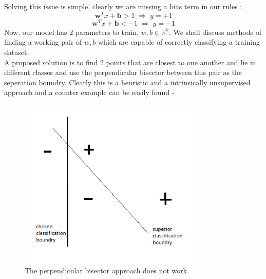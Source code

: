 \documentclass[12pt]{article}
\begin{document}
Solving this issue is simple, clearly we are missing a bias term in our rules :
$$\mathbf{w}^Tx + \mathbf{b} > 1 \; \Rightarrow \; y=+1$$
$$\mathbf{w}^Tx + \mathbf{b} < -1 \; \Rightarrow \; y=-1$$
Now, our model has 2 parameters to train, $w,b \in \mathbb{R}^k$. We shall discuss methods of finding a working pair of $w,b$ which are capable of correctly classifying a training dataset.\\[2mm]
A proposed solution is to find 2 points that are closest to one another and lie in different classes and use the perpendicular bisector between this pair as the seperation boundry. Clearly this is a heuristic and a intrinsically unsupervised approach and a counter example can be easily found -
\begin{figure}[H]
    \centering
    \includegraphics[width=9cm]{counter-perp-bisector.png}%
    \caption{The perpendicular bisector approach does not work.}
\end{figure}
\end{document}
